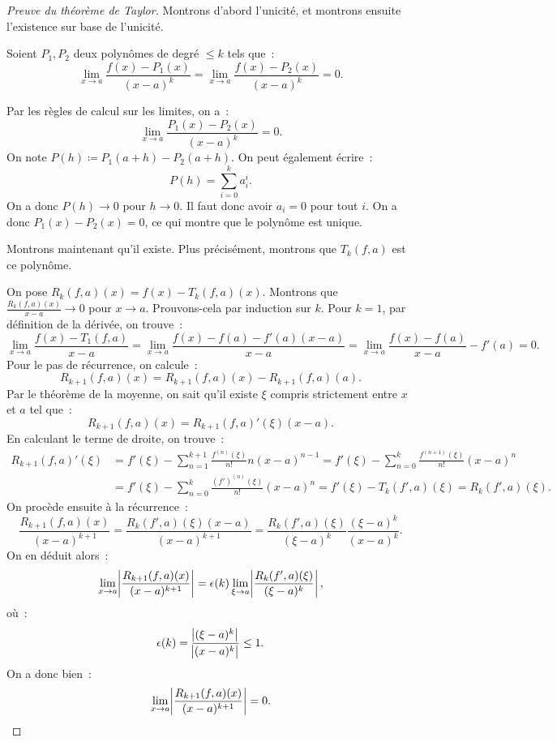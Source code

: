\documentclass{article}
\theoremstyle{definition}
\theoremstyle{remark}
\begin{document}
		\begin{proof}[Preuve du théorème de Taylor] Montrons d'abord l'unicité, et montrons ensuite l'existence sur base de l'unicité.

		Soient $P_1, P_2$ deux polynômes de degré $\leq k$ tels que~:
		\[\lim_{x \to a}\frac {f(x) - P_1(x)}{(x-a)^k} = \lim_{x \to a}\frac {f(x) - P_2(x)}{(x-a)^k} = 0.\]

		Par les règles de calcul sur les limites, on a~:
		\[\lim_{x \to a}\frac {P_1(x)-P_2(x)}{(x-a)^k} = 0.\]
		On note $P(h) \coloneqq P_1(a+h)-P_2(a+h)$. On peut également écrire~:
		\[P(h) = \sum_{i=0}^ka_i^i.\]
		On a donc $P(h) \to 0$ pour $h \to 0$. Il faut donc avoir $a_i = 0$ pour tout $i$. On a donc $P_1(x)-P_2(x) = 0$, ce qui montre que le polynôme est unique.

		Montrons maintenant qu'il existe. Plus précisément, montrons que $T_k(f, a)$ est ce polynôme.

		On pose $R_k(f, a)(x) = f(x) - T_k(f, a)(x)$. Montrons que $\frac {R_k(f, a)(x)}{x-a} \to 0$ pour $x \to a$. Prouvons-cela par induction sur $k$.
		Pour $k=1$, par définition de la dérivée, on trouve~:
		\[\lim_{x \to a}\frac {f(x)-T_1(f, a)}{x-a} = \lim_{x \to a}\frac {f(x) - f(a) - f'(a)(x-a)}{x-a} = \lim_{x \to a}\frac {f(x)-f(a)}{x-a} - f'(a) = 0.\]
		Pour le pas de récurrence, on calcule~:
		\[R_{k+1}(f, a)(x) = R_{k+1}(f, a)(x) - R_{k+1}(f, a)(a).\]
		Par le théorème de la moyenne, on sait qu'il existe $\xi$ compris strictement entre $x$ et $a$ tel que~:
		\[R_{k+1}(f, a)(x) = R_{k+1}(f, a)'(\xi)(x-a).\]
		En calculant le terme de droite, on trouve~:
		\begin{align*}
			R_{k+1}(f, a)'(\xi) &= f'(\xi) - \sum_{n=1}^{k+1}\frac {f^{(n)}(\xi)}{n!}n(x-a)^{n-1} = f'(\xi) - \sum_{n=0}^k\frac {f^{(n+1)}(\xi)}{n!}(x-a)^n \\
			&= f'(\xi) - \sum_{n=0}^k\frac {(f')^{(n)}(\xi)}{n!}(x-a)^n = f'(\xi) - T_k(f', a)(\xi) = R_k(f', a)(\xi).
		\end{align*}
		On procède ensuite à la récurrence~:
		\[\frac {R_{k+1}(f, a)(x)}{(x-a)^{k+1}} = \frac {R_k(f', a)(\xi)(x-a)}{(x-a)^{k+1}} = \frac {R_k(f', a)(\xi)}{(\xi - a)^k}\frac {(\xi-a)^k}{(x-a)^k}.\]
		On en déduit alors~:
		\[\lim_{x \to a}\abs {\frac {R_{k+1}(f, a)(x)}{(x-a)^{k+1}}} = \epsilon(k)\lim_{\xi \to a}\abs {\frac {R_k(f', a)(\xi)}{(\xi-a)^k}},\]
		où~:
		\[\epsilon(k) = \frac {\abs {(\xi-a)^k}}{\abs {(x-a)^k}} \leq 1.\]
		On a donc bien~:
		\[\lim_{x \to a}\abs {\frac {R_{k+1}(f, a)(x)}{(x-a)^{k+1}}} = 0.\]
		\end{proof}
\end{document}

